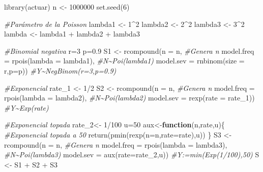 \documentclass[
]{article}
\newenvironment{Shaded}{\begin{snugshade}}{\end{snugshade}}
\newcommand{\AttributeTok}[1]{\textcolor[rgb]{0.77,0.63,0.00}{#1}}
\newcommand{\CommentTok}[1]{\textcolor[rgb]{0.56,0.35,0.01}{\textit{#1}}}
\newcommand{\ControlFlowTok}[1]{\textcolor[rgb]{0.13,0.29,0.53}{\textbf{#1}}}
\newcommand{\DecValTok}[1]{\textcolor[rgb]{0.00,0.00,0.81}{#1}}
\newcommand{\FloatTok}[1]{\textcolor[rgb]{0.00,0.00,0.81}{#1}}
\newcommand{\FunctionTok}[1]{\textcolor[rgb]{0.00,0.00,0.00}{#1}}
\newcommand{\NormalTok}[1]{#1}
\newcommand{\OtherTok}[1]{\textcolor[rgb]{0.56,0.35,0.01}{#1}}
\newcommand{\SpecialCharTok}[1]{\textcolor[rgb]{0.00,0.00,0.00}{#1}}
\begin{document}
\begin{Shaded}
\begin{Highlighting}[]
\FunctionTok{library}\NormalTok{(actuar)}
\NormalTok{n }\OtherTok{\textless{}{-}} \DecValTok{1000000}
\FunctionTok{set.seed}\NormalTok{(}\DecValTok{6}\NormalTok{)}

\CommentTok{\#Parámetro de la Poisson}
\NormalTok{lambda1 }\OtherTok{\textless{}{-}} \DecValTok{1}\SpecialCharTok{\^{}}\DecValTok{2}
\NormalTok{lambda2 }\OtherTok{\textless{}{-}} \DecValTok{2}\SpecialCharTok{\^{}}\DecValTok{2}
\NormalTok{lambda3 }\OtherTok{\textless{}{-}} \DecValTok{3}\SpecialCharTok{\^{}}\DecValTok{2}
\NormalTok{lambda }\OtherTok{\textless{}{-}}\NormalTok{ lambda1 }\SpecialCharTok{+}\NormalTok{ lambda2 }\SpecialCharTok{+}\NormalTok{ lambda3}

\CommentTok{\#Binomial negativa}
\NormalTok{r}\OtherTok{=}\DecValTok{3}
\NormalTok{p}\OtherTok{=}\FloatTok{0.9}
\NormalTok{S1 }\OtherTok{\textless{}{-}} \FunctionTok{rcompound}\NormalTok{(}\AttributeTok{n =}\NormalTok{ n, }\CommentTok{\#Genera n}
                \AttributeTok{model.freq =} \FunctionTok{rpois}\NormalTok{(}\AttributeTok{lambda =}\NormalTok{ lambda1), }\CommentTok{\#N\textasciitilde{}Poi(lambda1)}
                \AttributeTok{model.sev =} \FunctionTok{rnbinom}\NormalTok{(}\AttributeTok{size =}\NormalTok{ r,}\AttributeTok{p=}\NormalTok{p)) }\CommentTok{\#Y\textasciitilde{}NegBinom(r=3,p=0.9) }

\CommentTok{\#Exponencial}
\NormalTok{rate\_1 }\OtherTok{\textless{}{-}} \DecValTok{1}\SpecialCharTok{/}\DecValTok{2}
\NormalTok{S2 }\OtherTok{\textless{}{-}} \FunctionTok{rcompound}\NormalTok{(}\AttributeTok{n =}\NormalTok{ n, }\CommentTok{\#Genera n}
               \AttributeTok{model.freq =} \FunctionTok{rpois}\NormalTok{(}\AttributeTok{lambda =}\NormalTok{ lambda2), }\CommentTok{\#N\textasciitilde{}Poi(lambda2)}
               \AttributeTok{model.sev =} \FunctionTok{rexp}\NormalTok{(}\AttributeTok{rate =}\NormalTok{ rate\_1)) }\CommentTok{\#Y\textasciitilde{}Exp(rate) }

\CommentTok{\#Exponencial topada}
\NormalTok{rate\_2}\OtherTok{\textless{}{-}} \DecValTok{1}\SpecialCharTok{/}\DecValTok{100}
\NormalTok{u}\OtherTok{=}\DecValTok{50}
\NormalTok{aux}\OtherTok{\textless{}{-}}\ControlFlowTok{function}\NormalTok{(n,rate,u)\{ }\CommentTok{\#Exponencial topada a 50}
  \FunctionTok{return}\NormalTok{(}\FunctionTok{pmin}\NormalTok{(}\FunctionTok{rexp}\NormalTok{(}\AttributeTok{n=}\NormalTok{n,}\AttributeTok{rate=}\NormalTok{rate),u))}
\NormalTok{\}}
\NormalTok{S3 }\OtherTok{\textless{}{-}} \FunctionTok{rcompound}\NormalTok{(}\AttributeTok{n =}\NormalTok{ n, }\CommentTok{\#Genera n}
                \AttributeTok{model.freq =} \FunctionTok{rpois}\NormalTok{(}\AttributeTok{lambda =}\NormalTok{ lambda3), }\CommentTok{\#N\textasciitilde{}Poi(lambda3)}
                \AttributeTok{model.sev =} \FunctionTok{aux}\NormalTok{(}\AttributeTok{rate=}\NormalTok{rate\_2,u)) }\CommentTok{\#Y:=min(Exp(1/100),50)}
\NormalTok{S }\OtherTok{\textless{}{-}}\NormalTok{ S1 }\SpecialCharTok{+}\NormalTok{ S2 }\SpecialCharTok{+}\NormalTok{ S3}


\end{Highlighting}
\end{Shaded}
\end{document}
